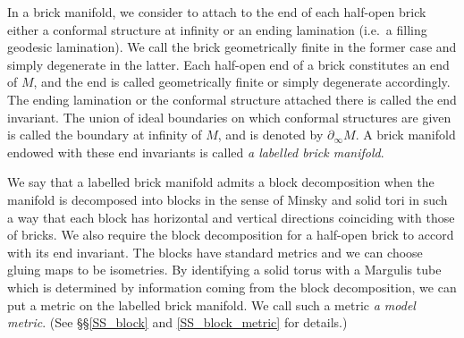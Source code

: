 \documentclass{amsart}
\theoremstyle{definition}
\numberwithin{figure}{section}
\numberwithin{equation}{section}
\newcommand{\ie}{i.e.\ }
\begin{document}
In a brick manifold, we consider to attach to the end of each half-open brick either a conformal structure at infinity or an ending lamination (\ie a filling geodesic lamination).
We call the brick geometrically finite in the former case and simply degenerate in the latter.
Each half-open end of a brick constitutes an end of $M$, and the end is called geometrically finite or simply degenerate accordingly.
The ending lamination or the conformal structure attached there is called the end invariant.
The union of ideal boundaries on which conformal structures are given is called the boundary at infinity of $M$, and is denoted by $\partial_\infty M$.
A brick manifold endowed with these end invariants is called {\em a labelled brick manifold}.

We say that a labelled brick manifold admits a block decomposition when the manifold is decomposed into blocks in the sense of Minsky  and solid tori in such a way that each block has horizontal and vertical directions coinciding with those of bricks.
We also require the block decomposition for a half-open brick to accord with its end invariant.
The blocks have standard metrics and we can choose gluing maps to be isometries.
By identifying a solid torus with a Margulis tube which is determined by information coming from the block decomposition, we can put a metric on the labelled brick manifold.
We call such a metric  {\em a model metric}.
(See \S\S \ref{SS_block} and \ref{SS_block_metric} for details.)

\end{document}

